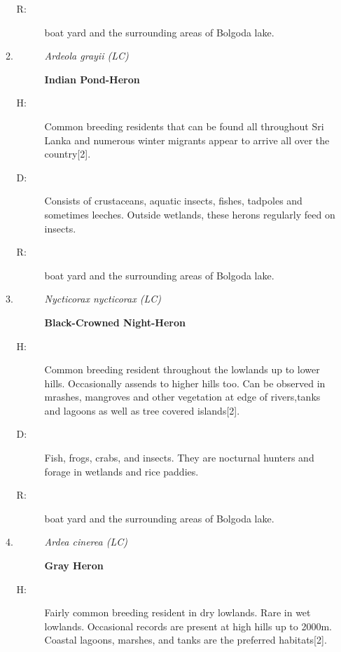 \begin{itemize}
\begin{enumerate}
\begin{description}
\item[R: ]%
boat yard and the surrounding areas of Bolgoda lake.%
\end{description}%
\item%
\begin{description}%
\item[]%
\textit{Ardeola grayii (LC)}%
\item[]%
\textbf{Indian Pond{-}Heron}%
\end{description}%
\begin{description}%
\item[H: ]%
 Common breeding residents that can be found all throughout Sri Lanka and numerous winter migrants appear to arrive all over the country{[}2{]}.%
\item[D: ]%
Consists of crustaceans, aquatic insects, fishes, tadpoles and sometimes leeches. Outside wetlands, these herons regularly feed on insects.%
\item[R: ]%
boat yard and the surrounding areas of Bolgoda lake.%
\end{description}%
\item%
\begin{description}%
\item[]%
\textit{Nycticorax nycticorax (LC)}%
\item[]%
\textbf{Black{-}Crowned Night{-}Heron}%
\end{description}%
\begin{description}%
\item[H: ]%
Common breeding resident throughout the lowlands  up to lower hills. Occasionally assends to higher hills too. Can be observed in mrashes, mangroves and other vegetation at edge of rivers,tanks and lagoons as well as tree covered islands{[}2{]}.%
\item[D: ]%
Fish, frogs, crabs, and insects. They are nocturnal hunters and forage in wetlands and rice paddies.%
\item[R: ]%
boat yard and the surrounding areas of Bolgoda lake.%
\end{description}%
\item%
\begin{description}%
\item[]%
\textit{Ardea cinerea (LC)}%
\item[]%
\textbf{Gray Heron}%
\end{description}%
\begin{description}%
\item[H: ]%
Fairly common breeding resident in dry lowlands. Rare in wet lowlands. Occasional records are present at high hills up to 2000m. Coastal lagoons, marshes, and tanks are the preferred habitats{[}2{]}.%

\end{description}
\end{enumerate}
\end{itemize}
